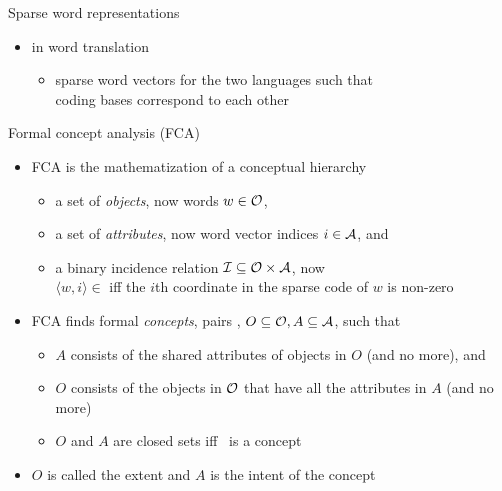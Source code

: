 \documentclass{beamer}
\newlength{\onecolwid}
\newcommand{\bull}[1]{
  \begin{itemize}
    \item #1
  \end{itemize}
}
\begin{document}
\begin{frame}[t]
\begin{columns}[t]
\begin{column}{\onecolwid}
\begin{block}{Sparse word representations}
\begin{itemize}
\begin{itemize}
              \item in word translation \citep{Berend:2018}
                \bull{sparse word vectors for the two languages such that \\ coding
                bases correspond to each other}
            \end{itemize}
        \end{itemize}
      \end{block}

      \begin{block}{Formal concept analysis (FCA)}
        \begin{itemize}
          \item FCA is the mathematization of a conceptual hierarchy
            \begin{itemize}
              \item a set of \emph{objects}, now words $w\in\mathcal O$,
              \item a set of \emph{attributes}, now word vector indices $i\in\mathcal A$, and
              \item a binary incidence relation
                $\mathcal I \subseteq \mathcal O \times \mathcal A$, now \\ 
                $\langle w,i\rangle\in$ iff the $i$th coordinate in the sparse code
                of $w$ is \alert{non-zero}
            \end{itemize}
          \item FCA finds formal \emph{concepts}, pairs \oaconc,
            $O\subseteq \mathcal O,A \subseteq \mathcal A$, such that
            \begin{itemize}
              \item $A$ consists of the shared attributes of objects in $O$
                (and no more), and
              \item $O$ consists of
                the objects in $\mathcal O$ that have all the attributes in $A$ (and
                no more)
              \item %
                $O$ and $A$ are closed sets iff \oaconc~is a concept
            \end{itemize}
          \item $O$ is called the extent and $A$ is the intent of the concept

\end{itemize}
\end{block}
\end{column}
\end{columns}
\end{frame}
\end{document}
